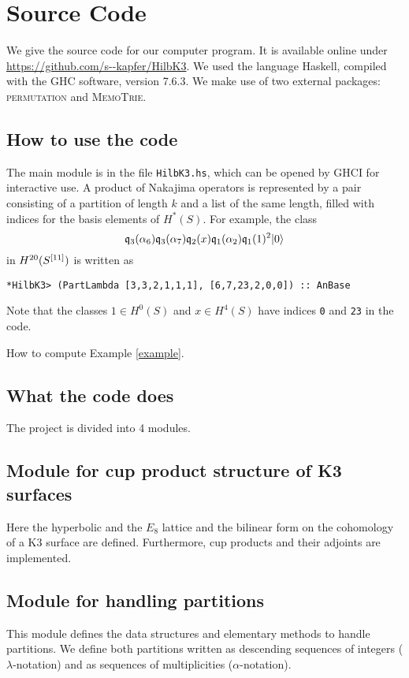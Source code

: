\appendix
\section{Source Code}
We give the source code for our computer program. It is available online under \url{https://github.com/s--kapfer/HilbK3}. We used the language Haskell, compiled with the \textsc{GHC} software, version 7.6.3. We make use of two external packages: \textsc{permutation} and \textsc{MemoTrie}.

\subsection{How to use the code}
The main module is in the file \verb|HilbK3.hs|, which can be opened by \textsc{GHCI} for interactive use. A product of Nakajima operators is represented by a pair consisting of a partition of length $k$ and a list of the same length, filled with indices for the basis elements of $H^*(S)$. For example, the class
$$
\mathfrak{q}_{3}(\alpha_6)\mathfrak{q}_{3}(\alpha_7)\mathfrak{q}_2(x)\mathfrak{q}_{1}(\alpha_2)\mathfrak{q}_{1}(1)^2 |0\rangle 
$$
in $H^{20}(S^{[11]})$ is written as
\begin{verbatim}
*HilbK3> (PartLambda [3,3,2,1,1,1], [6,7,23,2,0,0]) :: AnBase 
\end{verbatim}
Note that the classes $1\in H^0(S)$ and $x\in H^4(S)$ have indices \verb|0| and \verb|23| in the code.
\begin{example}\label{exampleSource} How to compute Example \ref{example}.
\end{example}

\subsection{What the code does}
The project is divided into 4 modules.
\subsection{Module for cup product structure of K3 surfaces} 
Here the hyperbolic and the $E_8$ lattice and the bilinear form on the cohomology of a K3 surface are defined. Furthermore, cup products and their adjoints are implemented.

\subsection{Module for handling partitions} 
This module defines the data structures and elementary methods to handle partitions. We define both partitions written as descending sequences of integers ($\lambda$-notation) and as sequences of multiplicities ($\alpha$-notation).

